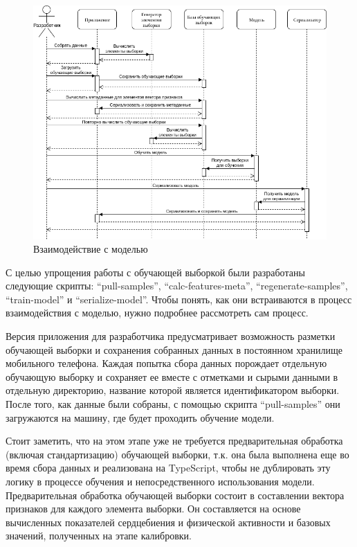\documentclass[14pt]{matmex-diploma-custom}
\begin{document}
\begin{figure}[ht]
  \centering \includegraphics[width=\textwidth]{images/model_interaction.png}
  \caption{Взаимодействие с моделью}
  \label{fig:model_interaction}
\end{figure}

С целью упрощения работы с обучающей выборкой были разработаны следующие скрипты:
``pull-samples'', ``calc-features-meta'', ``regenerate-samples'',
``train-model'' и ``serialize-model''. Чтобы понять, как они встраиваются в
процесс взаимодействия с моделью, нужно подробнее рассмотреть сам процесс.

Версия приложения для разработчика предусматривает возможность разметки
обучающей выборки и сохранения собранных данных в постоянном хранилище
мобильного телефона. Каждая попытка сбора данных порождает отдельную обучающую
выборку и сохраняет ее вместе с отметками и сырыми данными в отдельную
директорию, название которой является идентификатором выборки. После того, как
данные были собраны, с помощью скрипта ``pull-samples'' они загружаются на
машину, где будет проходить обучение модели.

Стоит заметить, что на этом этапе уже не требуется предварительная обработка
(включая стандартизацию) обучающей выборки, т.к. она была выполнена еще во время
сбора данных и реализована на TypeScript, чтобы не дублировать эту логику в
процессе обучения и непосредственного использования модели. Предварительная
обработка обучающей выборки состоит в составлении вектора признаков для каждого
элемента выборки. Он составляется на основе вычисленных показателей сердцебиения
и физической активности и базовых значений, полученных на этапе калибровки.
\end{document}
